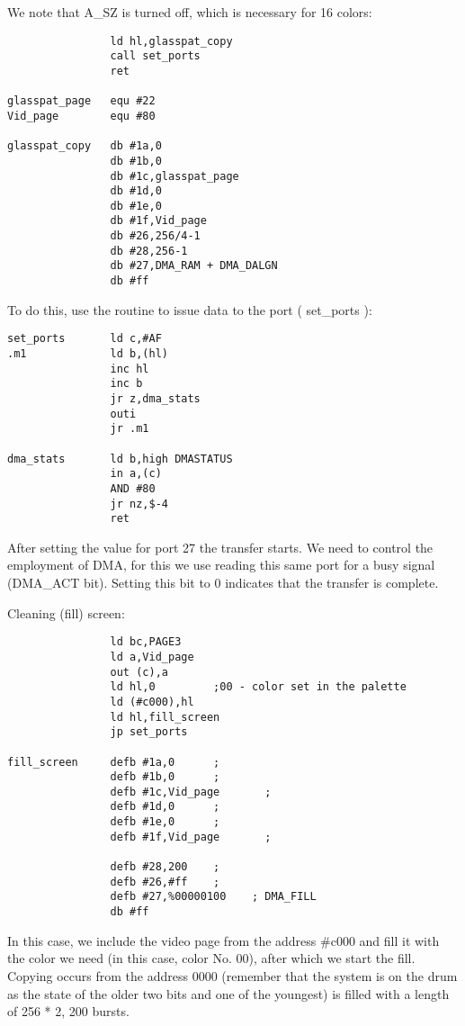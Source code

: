 We note that A\_SZ is turned off, which is necessary for 16 colors:
\begin{verbatim}
                ld hl,glasspat_copy
                call set_ports
                ret

glasspat_page   equ #22
Vid_page        equ #80

glasspat_copy   db #1a,0
                db #1b,0
                db #1c,glasspat_page
                db #1d,0
                db #1e,0
                db #1f,Vid_page
                db #26,256/4-1
                db #28,256-1
                db #27,DMA_RAM + DMA_DALGN
                db #ff
\end{verbatim}
To do this, use the routine to issue data to the port ( set\_ports ):
\begin{verbatim}
set_ports       ld c,#AF
.m1             ld b,(hl)
                inc hl
                inc b
                jr z,dma_stats
                outi
                jr .m1

dma_stats       ld b,high DMASTATUS
                in a,(c)
                AND #80
                jr nz,$-4
                ret
\end{verbatim}
After setting the value for port 27 the transfer starts. We need to
control the employment of DMA, for this we use reading this same port
for a busy signal (DMA\_ACT bit). Setting this bit to 0 indicates that
the transfer is complete.

Cleaning (fill) screen:
\begin{verbatim}
                ld bc,PAGE3
                ld a,Vid_page
                out (c),a
                ld hl,0         ;00 - color set in the palette
                ld (#c000),hl
                ld hl,fill_screen
                jp set_ports

fill_screen     defb #1a,0      ;
                defb #1b,0      ;
                defb #1c,Vid_page       ;
                defb #1d,0      ;
                defb #1e,0      ;
                defb #1f,Vid_page       ;

                defb #28,200    ;
                defb #26,#ff    ;
                defb #27,%00000100    ; DMA_FILL
                db #ff
\end{verbatim}
In this case, we include the video page from the address \#c000 and
fill it with the color we need (in this case, color No. 00), after
which we start the fill. Copying occurs from the address 0000
(remember that the system is on the drum as the state of the older two
bits and one of the youngest) is filled with a length of 256 * 2, 200
bursts.

